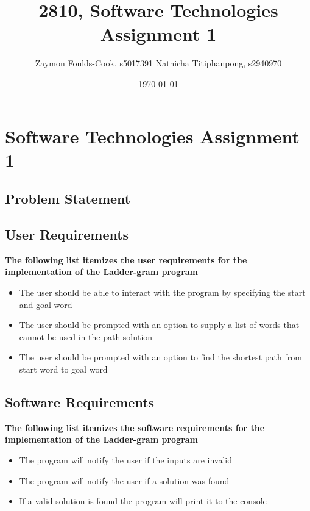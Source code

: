 \documentclass[12pt, a4]{report}
\title{2810, Software Technologies Assignment 1}
\author{Zaymon Foulds-Cook, s5017391 \textbar{} Natnicha Titiphanpong, s2940970}%
\date{\today}
\begin{document}
\begin{titlepage}
	\maketitle
\end{titlepage}
 \tableofcontents
\pagebreak
\section{Software Technologies Assignment 1}
\subsection{Problem Statement}
	\par
	
\subsection{User Requirements}
	\textbf{The following list itemizes the user requirements for the implementation of the Ladder-gram program}
	\begin{itemize}
		\item The user should be able to interact with the program by specifying the start and goal word
	\end{itemize}
	\begin{itemize}
		\item The user should be prompted with an option to supply a list of words that cannot be used in the path solution
	\end{itemize}
	\begin{itemize}
		\item The user should be prompted with an option to find the shortest path from start word to goal word
	\end{itemize}
	
\subsection{Software Requirements}
	\textbf{The following list itemizes the software requirements for the implementation of the Ladder-gram program}
	\begin{itemize}
		\item The program will notify the user if the inputs are invalid
		\item The program will notify the user if a solution was found
		\item If a valid solution is found the program will print it to the console
	\end{itemize}
	\pagebreak
	
\end{document}
